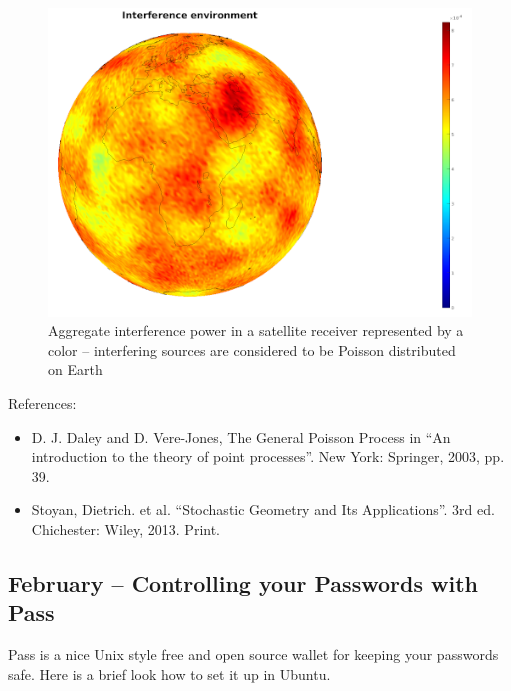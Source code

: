 \documentclass{article}
\begin{document}
\begin{figure}
  \includegraphics[width=\linewidth]{interferenceenvironment.png}
  \caption{Aggregate interference power in a satellite receiver represented by a color – interfering sources are considered to be Poisson distributed on Earth}
\end{figure}

References:
\begin{itemize}
\item D. J. Daley and D. Vere-Jones, The General Poisson Process in  ``An introduction to the theory of point processes''. New York: Springer, 2003, pp. 39. 
\item Stoyan, Dietrich. et al. ``Stochastic Geometry and Its Applications''. 3rd ed. Chichester: Wiley, 2013. Print.
\end{itemize}




\subsection{February – Controlling your Passwords with Pass}
Pass is a nice Unix style free and open source wallet for keeping your passwords safe. Here is a brief look how to set it up in Ubuntu.
\end{document}

